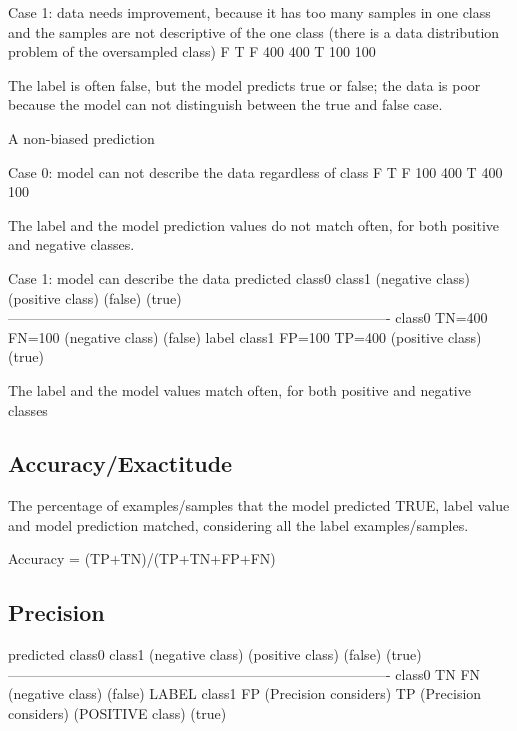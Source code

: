 \documentclass[11pt, onecolumn]{article}
\begin{document}
Case 1: data needs improvement, because it has too many samples in one class and the samples are not descriptive of the one class (there is a data distribution problem of the oversampled class) 
	F	T
F	400	400
T	100	100

The label is often false, but the model predicts true or false; the data is poor because the model can not distinguish between the true and false case.


A non-biased prediction

Case 0: model can not describe the data regardless of class
	F	T
F	100	400
T	400	100

The label and the model prediction values do not match often, for both positive and negative classes.


Case 1: model can describe the data
					predicted
			class0					class1
        	   (negative class)                         (positive class)
        	       (false)                                  (true)
	----------------------------------------------------------------------------------
	class0		TN=400					FN=100
   (negative class)
        (false)
label
	class1		FP=100					TP=400
   (positive class)
        (true)

The label and the model values match often, for both positive and negative classes





\subsection{Accuracy/Exactitude}

The percentage of examples/samples that the model predicted TRUE, label value and model prediction matched, considering all the label examples/samples.

Accuracy = (TP+TN)/(TP+TN+FP+FN)





\subsection{Precision}

					predicted
			class0					class1
        	   (negative class)                         (positive class)
        	       (false)                                  (true)
	----------------------------------------------------------------------------------
	class0		TN					FN
   (negative class)
        (false)
LABEL
	class1		FP  (Precision considers)		TP (Precision considers)
   (POSITIVE class)
        (true)
\end{document}
